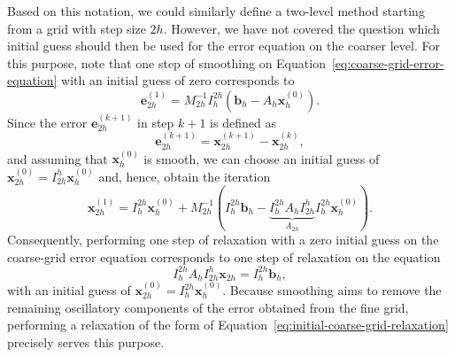 Based on this notation, we could similarly define a two-level method starting from a grid with step size $2h$.
However, we have not covered the question which initial guess should then be used for the error equation on the coarser level.
For this purpose, note that one step of smoothing on Equation~\eqref{eq:coarse-grid-error-equation} with an initial guess of zero corresponds to
\begin{equation}
	\bm{e}_{2h}^{(1)} = M_{2h}^{-1} I_{h}^{2h} \left(\bm{b}_h - A_h \bm{x}^{(0)}_h\right).
	\label{eq:initial-coarse-grid-relaxation}
\end{equation}
Since the error $\bm{e}_{2h}^{(k+1)}$ in step $k+1$ is defined as
\begin{equation*}
	\bm{e}_{2h}^{(k+1)} = \bm{x}_{2h}^{(k+1)} - \bm{x}_{2h}^{(k)},
\end{equation*}
and assuming that $\bm{x}_{h}^{(0)}$ is smooth, we can choose an initial guess of $\bm{x}_{2h}^{(0)} = I_{2h}^{h} \bm{x}_{h}^{(0)}$ and, hence, obtain the iteration
\begin{equation}
	\bm{x}_{2h}^{(1)} = I_{h}^{2h} \bm{x}_{h}^{(0)} + M_{2h}^{-1} ( I_{h}^{2h} \bm{b}_h - \underbrace{I_{h}^{2h} A_h I_{2h}^{h}}_{A_{2h}} I_{h}^{2h} \bm{x}_{h}^{(0)} ).
\end{equation}
Consequently, performing one step of relaxation with a zero initial guess on the coarse-grid error equation corresponds to one step of relaxation on the equation
\begin{equation}
	I_{h}^{2h} A_h I_{2h}^h \bm{x}_{2h} = I_{h}^{2h} \bm{b}_h,
\end{equation}
with an initial guess of $\bm{x}_{2h}^{(0)} = I_{h}^{2h} \bm{x}_{h}^{(0)}$.
Because smoothing aims to remove the remaining oscillatory components of the error obtained from the fine grid, performing a relaxation of the form of Equation~\eqref{eq:initial-coarse-grid-relaxation} precisely serves this purpose.

